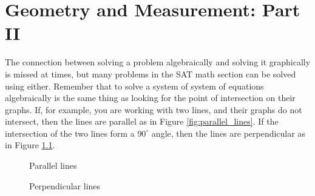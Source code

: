 \chapter{Geometry and Measurement: Part II}

The connection between solving a problem algebraically and solving it graphically is missed at times, but many problems in the SAT math section can be solved using either. Remember that to solve a system of system of equations algebraically is the same thing as looking for the point of intersection on their graphs. If, for example, you are working with two lines, and their graphs do not intersect, then the lines are parallel as in Figure \ref{fig:parallel_lines}. If the intersection of the two lines form a $90^\circ$ angle, then the lines are perpendicular as in Figure \ref{fig:perpendicular_lines}.

\bigskip
\begin{figure}[h]
\centering
\begin{minipage}[b]{0.45\textwidth}
\centering
{}
\caption{Parallel lines}
\label{fig:parallel_lines}
\end{minipage}
\quad
\begin{minipage}[b]{0.45\textwidth}
\centering
{}
\caption{Perpendicular lines}
\label{fig:perpendicular_lines}
\end{minipage}
\end{figure}